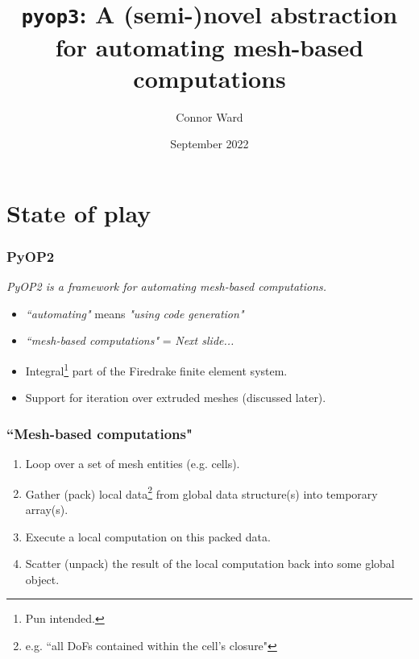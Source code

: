 \documentclass{beamer}
\title{\texttt{pyop3}: A (semi-)novel abstraction for automating mesh-based computations}
\author{Connor Ward}
\date{September 2022}
\begin{document}
\frame{\titlepage}

\section{State of play}

\begin{frame}
  \frametitle{PyOP2}

  \large
  \textit{PyOP2 is a framework for automating mesh-based computations.}
  \normalsize

  \begin{itemize}
    \item
      \textit{``automating"} means \textit{"using code generation"}
    \item
      \textit{``mesh-based computations"} = \textit{Next slide...}
    \item
      Integral\footnote{Pun intended.} part of the Firedrake finite element system.
    \item
      Support for iteration over extruded meshes (discussed later).
  \end{itemize}
\end{frame}

\begin{frame}
  \frametitle{``Mesh-based computations"}

  \begin{enumerate}
    \item Loop over a set of mesh entities (e.g. cells).
    \item Gather (pack) local data\footnote{e.g. ``all DoFs contained within the cell's closure"} from global data structure(s) into temporary array(s).
    \item Execute a local computation on this packed data.
    \item Scatter (unpack) the result of the local computation back into some global object.
  \end{enumerate}
\end{frame}
\end{document}
